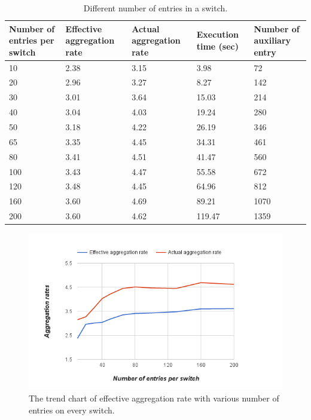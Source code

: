 \begin{table}
\centering
\caption{Different number of entries in a switch.}
\begin{tabular}{|p{1.8cm}|p{2.6cm}|p{2.6cm}|p{1.9cm}|p{2.8cm}|}
\hline Number of entries per switch & Effective aggregation rate & Actual aggregation rate & Execution time (sec) & Number of auxiliary entry \\
\hline
\hline 10 & 2.38 & 3.15 & 3.98 & 72 \\
\hline 20 & 2.96 & 3.27 & 8.27 & 142 \\
\hline 30 & 3.01 & 3.64 & 15.03 & 214 \\
\hline 40 & 3.04 & 4.03 & 19.24 & 280 \\
\hline 50 & 3.18 & 4.22 & 26.19 & 346 \\
\hline 65 & 3.35 & 4.45 & 34.31 & 461 \\
\hline 80 & 3.41 & 4.51 & 41.47 & 560 \\
\hline 100 & 3.43 & 4.47 & 55.58 & 672 \\
\hline 120 & 3.48 & 4.45 & 64.96 & 812 \\
\hline 160 & 3.60 & 4.69 & 89.21 & 1070 \\
\hline 200 & 3.60 & 4.62 & 119.47 & 1359 \\
\hline 
\end{tabular}
\label{table:different_entry_per_switch}
\end{table}

\begin{figure}[H]
\begin{center} 
\includegraphics[width=1\textwidth]{figures/exp_entrynum_trend.png}
\end{center}
\caption{The trend chart of effective aggregation rate with various number of entries on every switch.}
\label{exp_entrynum_trend}
\end{figure}

